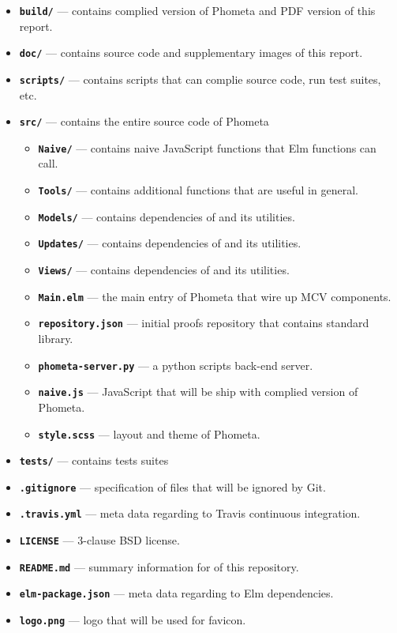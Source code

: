 \documentclass[master.tex]{subfiles}
\begin{document}
\begin{itemize}
\item \texttt{\textbf{build/}} --- contains complied version of Phometa and PDF
  version of this report.

\item \texttt{\textbf{doc/}} --- contains source code and supplementary images
  of this report.

\item \texttt{\textbf{scripts/}} --- contains scripts that can complie source
  code, run test suites, etc.

\item \texttt{\textbf{src/}} --- contains the entire source code of Phometa
  \begin{itemize}
  \renewcommand{\labelitemii}{$\star$}
  \item \texttt{\textbf{Naive/}} --- contains naive JavaScript functions that
    Elm functions can call.
  \item \texttt{\textbf{Tools/}} --- contains additional functions that are
    useful in general.
  \item \texttt{\textbf{Models/}} --- contains dependencies of  and
    its utilities.
  \item \texttt{\textbf{Updates/}} --- contains dependencies of 
    and its utilities.
  \item \texttt{\textbf{Views/}} --- contains dependencies of 
    and its utilities.
  \item \texttt{\textbf{Main.elm}} --- the main entry of Phometa that
    wire up MCV components.
  \item \texttt{\textbf{repository.json}} --- initial proofs repository that
    contains standard library.
  \item \texttt{\textbf{phometa-server.py}} --- a python scripts back-end server.
  \item \texttt{\textbf{naive.js}} --- JavaScript that will be ship with
    complied version of Phometa.
  \item \texttt{\textbf{style.scss}} --- layout and theme of Phometa.
  \end{itemize}
\item \texttt{\textbf{tests/}} --- contains tests suites
\item \texttt{\textbf{.gitignore}} --- specification of files that will be
  ignored by Git.
\item \texttt{\textbf{.travis.yml}} --- meta data regarding to Travis continuous
  integration.
\item \texttt{\textbf{LICENSE}} --- 3-clause BSD license.
\item \texttt{\textbf{README.md}} --- summary information for of this repository.
\item \texttt{\textbf{elm-package.json}} --- meta data regarding to Elm
  dependencies.
\item \texttt{\textbf{logo.png}} --- logo that will be used for favicon.

\end{itemize}
\end{document}
